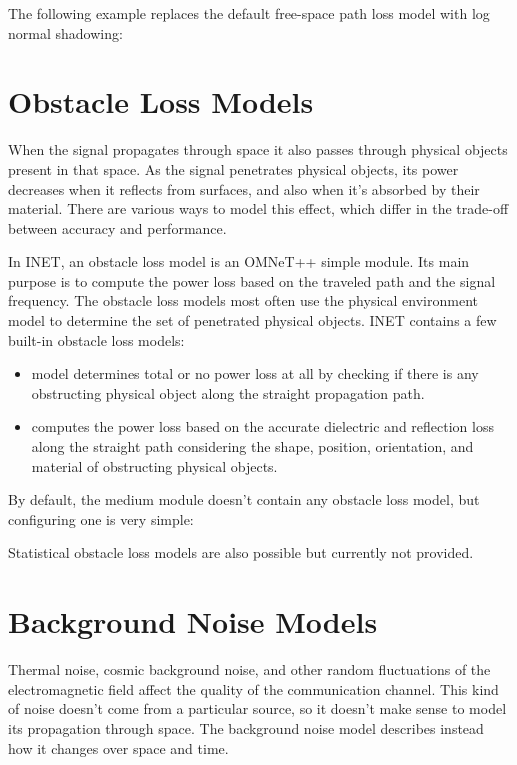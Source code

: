 The following example replaces the default free-space path loss model with
log normal shadowing:


\section{Obstacle Loss Models}

When the signal propagates through space it also passes through physical
objects present in that space. As the signal penetrates physical objects,
its power decreases when it reflects from surfaces, and also when it’s
absorbed by their material. There are various ways to model this effect,
which differ in the trade-off between accuracy and performance.

In INET, an obstacle loss model is an OMNeT++ simple module. Its main
purpose is to compute the power loss based on the traveled path and the
signal frequency. The obstacle loss models most often use the physical
environment model to determine the set of penetrated physical objects.
INET contains a few built-in obstacle loss models:

\begin{itemize}
        \item {} model determines total or no power loss at all by checking if there is any obstructing physical object along the straight propagation path.
        \item {} computes the power loss based on the accurate dielectric and reflection loss along the straight path considering the shape, position, orientation, and material of obstructing physical objects.
\end{itemize}

By default, the medium module doesn't contain any obstacle loss model, but
configuring one is very simple:


Statistical obstacle loss models are also possible but currently not provided.

\section{Background Noise Models}

Thermal noise, cosmic background noise, and other random fluctuations of
the electromagnetic field affect the quality of the communication channel.
This kind of noise doesn’t come from a particular source, so it doesn’t
make sense to model its propagation through space. The background noise
model describes instead how it changes over space and time.

